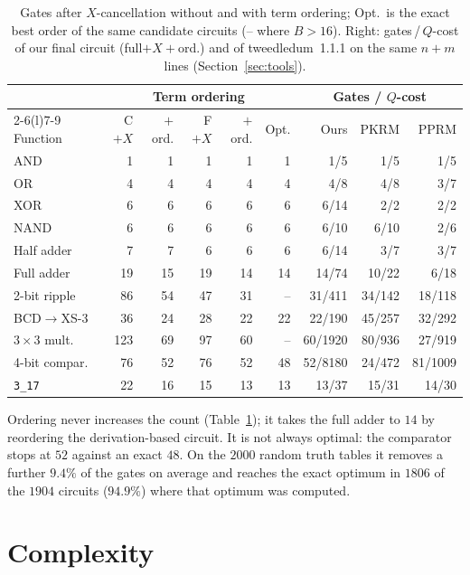 \documentclass[conference]{IEEEtran}
\theoremstyle{plain}
\begin{document}
\begin{table}[t]
\centering
\caption{Gates after $X$-cancellation without and with term ordering;
Opt.\ is the exact best order of the same candidate circuits (-- where
$B>16$). Right: gates\,/\,$Q$-cost of our final circuit (full$+X+$ord.)
and of tweedledum~1.1.1 on the same $n+m$ lines (Section~\ref{sec:tools}).}
\label{tab:order}
\footnotesize
\setlength{\tabcolsep}{2.6pt}
\begin{tabular}{@{}lrrrrrrrr@{}}
\toprule
& \multicolumn{5}{c}{Term ordering} & \multicolumn{3}{c}{Gates / $Q$-cost}\\
\cmidrule(lr){2-6}\cmidrule(l){7-9}
Function & C$+X$ & $+$ord. & F$+X$ & $+$ord. & Opt. & Ours & PKRM & PPRM\\
\midrule
AND & 1 & 1 & 1 & 1 & 1 & 1/5 & 1/5 & 1/5\\
OR & 4 & 4 & 4 & 4 & 4 & 4/8 & 4/8 & 3/7\\
XOR & 6 & 6 & 6 & 6 & 6 & 6/14 & 2/2 & 2/2\\
NAND & 6 & 6 & 6 & 6 & 6 & 6/10 & 6/10 & 2/6\\
Half adder & 7 & 7 & 6 & 6 & 6 & 6/14 & 3/7 & 3/7\\
Full adder & 19 & 15 & 19 & 14 & 14 & 14/74 & 10/22 & 6/18\\
2-bit ripple & 86 & 54 & 47 & 31 & -- & 31/411 & 34/142 & 18/118\\
BCD$\to$XS-3 & 36 & 24 & 28 & 22 & 22 & 22/190 & 45/257 & 32/292\\
$3{\times}3$ mult. & 123 & 69 & 97 & 60 & -- & 60/1920 & 80/936 & 27/919\\
4-bit compar. & 76 & 52 & 76 & 52 & 48 & 52/8180 & 24/472 & 81/1009\\
\texttt{3\_17} & 22 & 16 & 15 & 13 & 13 & 13/37 & 15/31 & 14/30\\
\bottomrule
\end{tabular}
\end{table}

Ordering never increases the count (Table~\ref{tab:order}); it takes
the full adder to $14$ by reordering the derivation-based circuit. It is
not always optimal: the comparator stops at $52$ against an exact $48$. On the $2000$ random truth tables it removes a further $9.4\%$
of the gates on average and reaches the exact optimum in $1806$ of the
$1904$ circuits ($94.9\%$) where that optimum was computed.

\section{Complexity}
\label{sec:complexity}
\end{document}
